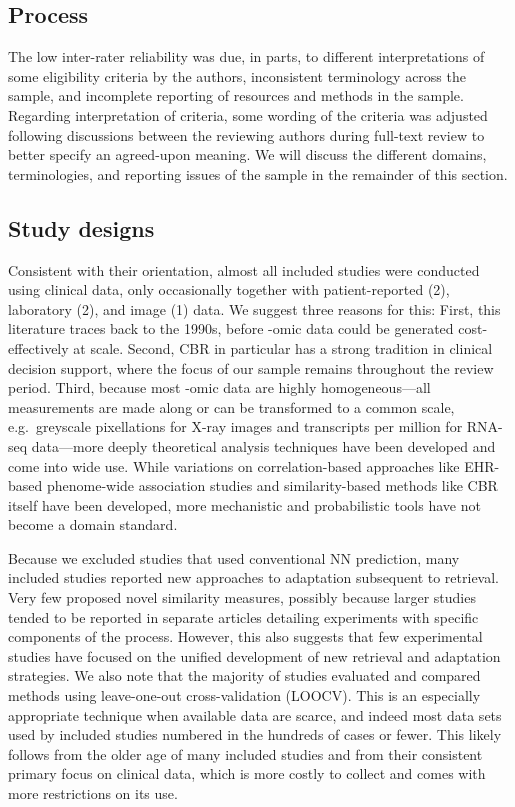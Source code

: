 \documentclass[preprint, 3p,
authoryear]{elsarticle} %
\begin{document}
\hypertarget{process}{%
\subsection{Process}\label{process}}

The low inter-rater reliability was due, in parts, to different
interpretations of some eligibility criteria by the authors,
inconsistent terminology across the sample, and incomplete reporting of
resources and methods in the sample. Regarding interpretation of
criteria, some wording of the criteria was adjusted following
discussions between the reviewing authors during full-text review to
better specify an agreed-upon meaning. We will discuss the different
domains, terminologies, and reporting issues of the sample in the
remainder of this section.

\hypertarget{study-designs}{%
\subsection{Study designs}\label{study-designs}}

Consistent with their orientation, almost all included studies were
conducted using clinical data, only occasionally together with
patient-reported (2), laboratory (2), and image (1) data. We suggest
three reasons for this: First, this literature traces back to the 1990s,
before -omic data could be generated cost-effectively at scale. Second,
CBR in particular has a strong tradition in clinical decision support,
where the focus of our sample remains throughout the review period.
Third, because most -omic data are highly homogeneous---all measurements
are made along or can be transformed to a common scale, e.g.~greyscale
pixellations for X-ray images and transcripts per million for RNA-seq
data---more deeply theoretical analysis techniques have been developed
and come into wide use. While variations on correlation-based approaches
like EHR-based phenome-wide association studies and similarity-based
methods like CBR itself have been developed, more mechanistic and
probabilistic tools have not become a domain standard.

Because we excluded studies that used conventional NN prediction, many
included studies reported new approaches to adaptation subsequent to
retrieval. Very few proposed novel similarity measures, possibly because
larger studies tended to be reported in separate articles detailing
experiments with specific components of the process. However, this also
suggests that few experimental studies have focused on the unified
development of new retrieval and adaptation strategies. We also note
that the majority of studies evaluated and compared methods using
leave-one-out cross-validation (LOOCV). This is an especially
appropriate technique when available data are scarce, and indeed most
data sets used by included studies numbered in the hundreds of cases or
fewer. This likely follows from the older age of many included studies
and from their consistent primary focus on clinical data, which is more
costly to collect and comes with more restrictions on its use.
\end{document}
